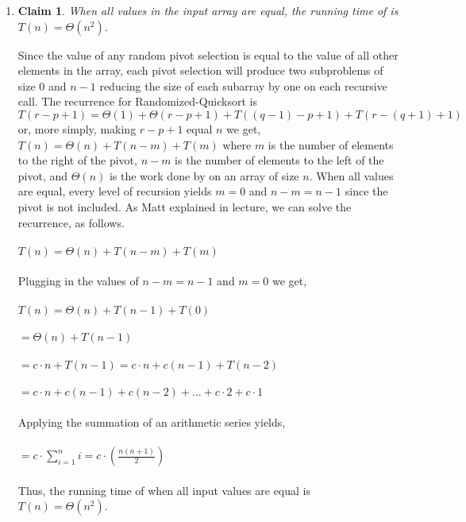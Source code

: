 \documentclass[11pt]{article}
\newtheorem{claim}[theorem]{Claim}
\theoremstyle{nonumberplain}
\begin{document}
\begin{enumerate}
\item \begin{claim}
When all values in the input array are equal, the running time of  is $T(n)=\Theta(n^2)$.
\end{claim}  
Since the value of any random pivot selection is equal to the value of all other elements in the array, each pivot selection will produce two subproblems of size 0 and $n-1$ reducing the size of each subarray by one on each recursive call. The recurrence for Randomized-Quicksort is $T(r-p+1)=\Theta(1)+\Theta(r-p+1)+T((q-1)-p+1)+T(r-(q+1)+1)$ or, more simply, making $r-p+1$ equal $n$ we get, $T(n)=\Theta(n)+T(n-m)+T(m)$ where $m$ is the number of elements to the right of the pivot, $n-m$ is the number of elements to the left of the pivot, and $\Theta(n)$ is the work done by  on an array of size $n$. When all values are equal, every level of recursion yields $m=0$ and $n-m=n-1$ since the pivot is not included. As Matt explained in lecture, we can solve the recurrence, as follows. \\
\\
$T(n)=\Theta(n)+T(n-m)+T(m)$ \\
\\
Plugging in the values of $n-m=n-1$ and $m=0$ we get, \\
\\
$T(n)=\Theta(n)+T(n-1)+T(0)$ \\
\\
\phantom{T(n) }$=\Theta(n)+T(n-1)$ \\
\\
\phantom{T(n) }$=c \cdot n+T(n-1)=c \cdot n+c(n-1)+T(n-2)$ \\
\\
\phantom{T(n) }$=c \cdot n+c(n-1)+c(n-2)+...+c \cdot 2+c \cdot 1$ \\
\\
Applying the summation of an arithmetic series yields, \\
\\
\phantom{T(n) }$=c \cdot \sum\limits_{i=1}^{n}i=c \cdot \left(\frac{n(n+1)}{2}\right)$ \\
\\
Thus, the running time of  when all input values are equal is $T(n)=\Theta(n^2)$.

\end{enumerate}
\end{document}
